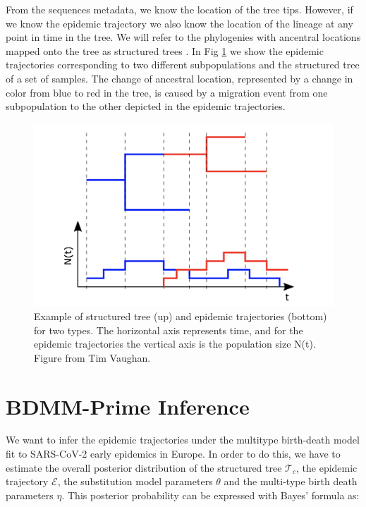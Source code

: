 From the sequences metadata, we know the location of the tree tips. However, if we know the epidemic trajectory we also know the location of the lineage at any point in time in the tree. We will refer to the phylogenies with ancentral locations mapped onto the tree as structured trees \cite{Vaughan2014}. In Fig \ref{fig:epitrajs} we show the epidemic trajectories corresponding to two different subpopulations and the structured tree of a set of samples. The change of ancestral location, represented by a change in color from blue to red in the tree, is caused by a migration event from one subpopulation to the other depicted in the epidemic trajectories.

\begin{figure}[h]
    \centering
    \includegraphics[width=\textwidth]{figures/epitrajs.png}
    \caption{Example of structured tree (up) and epidemic trajectories (bottom) for two types. The horizontal axis represents time, and for the epidemic trajectories the vertical axis is the population size N(t). Figure from Tim Vaughan.}
    \label{fig:epitrajs}
\end{figure}

\section{BDMM-Prime Inference}

We want to infer the epidemic trajectories under the multitype birth-death model fit to SARS-CoV-2 early epidemics in Europe. In order to do this, we have to estimate the overall posterior distribution of the structured tree $\mathcal{T}_c$, the epidemic trajectory $\mathcal{E}$, the substitution model parameters $\theta$ and the multi-type birth death parameters $\eta$. This posterior probability can be expressed with Bayes' formula as:

